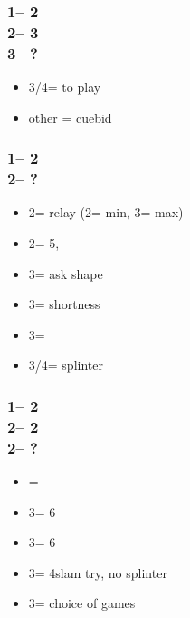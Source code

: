 \documentclass[12pt, a4paper]{report}
\begin{document}
{{        \subsubsection*{1\nt -- 2\clubs\\
                        2\diams -- 3\diams\\
                        3\major -- ?}
        \begin{itemize}
            \item 3\nt/4\major = to play
            \item other = cuebid
        \end{itemize}

        \subsubsection*{1\nt -- 2\clubs\\
                        2\hearts -- ?}
        \begin{itemize}
            \item 2\spades = relay (2\nt = min, 3\clubs = max)
            \item 2\nt = 5\spades, \inv
            \item 3\clubs = ask shape
            \item 3\diams = \minor shortness
            \item 3\hearts = \inv
            \item 3\spades/4\minor = splinter
        \end{itemize}

        \subsubsection*{1\nt -- 2\clubs\\
                        2\hearts -- 2\spades\\
                        2\nt -- ?}
        \begin{itemize}
            \item \pass = \inv\ \bal
            \item 3\clubs = 6\spades\ \inv
            \item 3\diams = 6\spades\ \inv
            \item 3\hearts = 4\hearts slam try, no splinter
            \item 3\nt = choice of games
        \end{itemize}

}}
\end{document}
